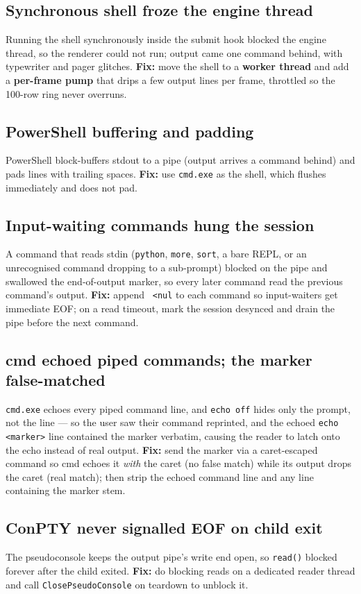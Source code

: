 \documentclass[11pt]{article}
\newcommand{\ic}[1]{\texttt{#1}}
\begin{document}
\subsection{Synchronous shell froze the engine thread}
Running the shell synchronously inside the submit hook blocked the engine thread, so
the renderer could not run; output came one command behind, with typewriter and pager
glitches. \textbf{Fix:} move the shell to a \textbf{worker thread} and add a
\textbf{per-frame pump} that drips a few output lines per frame, throttled so the
100-row ring never overruns.

\subsection{PowerShell buffering and padding}
PowerShell block-buffers stdout to a pipe (output arrives a command behind) and pads
lines with trailing spaces. \textbf{Fix:} use \texttt{cmd.exe} as the shell, which
flushes immediately and does not pad.

\subsection{Input-waiting commands hung the session}
A command that reads stdin (\texttt{python}, \texttt{more}, \texttt{sort}, a bare REPL,
or an unrecognised command dropping to a sub-prompt) blocked on the pipe and swallowed
the end-of-output marker, so every later command read the previous command's output.
\textbf{Fix:} append \ic{ <nul} to each command so input-waiters get immediate EOF; on a
read timeout, mark the session desynced and drain the pipe before the next command.

\subsection{cmd echoed piped commands; the marker false-matched}
\texttt{cmd.exe} echoes every piped command line, and \texttt{echo off} hides only the
prompt, not the line --- so the user saw their command reprinted, and the echoed
\ic{echo <marker>} line contained the marker verbatim, causing the reader to latch onto
the echo instead of real output. \textbf{Fix:} send the marker via a caret-escaped
command so cmd echoes it \emph{with} the caret (no false match) while its output drops
the caret (real match); then strip the echoed command line and any line containing the
marker stem.

\subsection{ConPTY never signalled EOF on child exit}
The pseudoconsole keeps the output pipe's write end open, so \ic{read()} blocked forever
after the child exited. \textbf{Fix:} do blocking reads on a dedicated reader thread and
call \texttt{ClosePseudoConsole} on teardown to unblock it.
\end{document}
